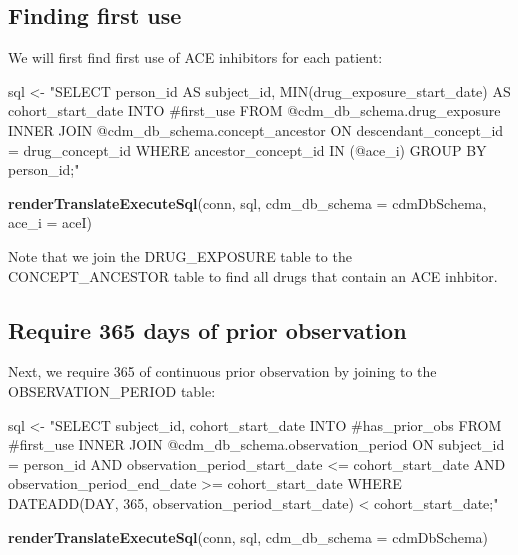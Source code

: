 \documentclass[11pt]{book}
\newenvironment{Shaded}{\begin{snugshade}}{\end{snugshade}}
\newcommand{\DataTypeTok}[1]{\textcolor[rgb]{0.13,0.29,0.53}{#1}}
\newcommand{\KeywordTok}[1]{\textcolor[rgb]{0.13,0.29,0.53}{\textbf{#1}}}
\newcommand{\NormalTok}[1]{#1}
\newcommand{\StringTok}[1]{\textcolor[rgb]{0.31,0.60,0.02}{#1}}
\theoremstyle{definition}
\theoremstyle{definition}
\theoremstyle{definition}
\theoremstyle{remark}
\begin{document}
\hypertarget{finding-first-use}{%
\subsection{Finding first use}\label{finding-first-use}}

We will first find first use of ACE inhibitors for each patient:

\begin{Shaded}
\begin{Highlighting}[]
\NormalTok{sql <-}\StringTok{ "SELECT person_id AS subject_id,}
\StringTok{  MIN(drug_exposure_start_date) AS cohort_start_date}
\StringTok{INTO #first_use}
\StringTok{FROM @cdm_db_schema.drug_exposure}
\StringTok{INNER JOIN @cdm_db_schema.concept_ancestor}
\StringTok{  ON descendant_concept_id = drug_concept_id}
\StringTok{WHERE ancestor_concept_id IN (@ace_i)}
\StringTok{GROUP BY person_id;"}

\KeywordTok{renderTranslateExecuteSql}\NormalTok{(conn, sql, }\DataTypeTok{cdm_db_schema =}\NormalTok{ cdmDbSchema, }\DataTypeTok{ace_i =}\NormalTok{ aceI)}
\end{Highlighting}
\end{Shaded}

Note that we join the DRUG\_EXPOSURE table to the CONCEPT\_ANCESTOR table to find all drugs that contain an ACE inhbitor.

\hypertarget{require-365-days-of-prior-observation}{%
\subsection{Require 365 days of prior observation}\label{require-365-days-of-prior-observation}}

Next, we require 365 of continuous prior observation by joining to the OBSERVATION\_PERIOD table:

\begin{Shaded}
\begin{Highlighting}[]
\NormalTok{sql <-}\StringTok{ "SELECT subject_id,}
\StringTok{  cohort_start_date}
\StringTok{INTO #has_prior_obs}
\StringTok{FROM #first_use}
\StringTok{INNER JOIN @cdm_db_schema.observation_period}
\StringTok{  ON subject_id = person_id}
\StringTok{    AND observation_period_start_date <= cohort_start_date}
\StringTok{    AND observation_period_end_date >= cohort_start_date}
\StringTok{WHERE DATEADD(DAY, 365, observation_period_start_date) < cohort_start_date;"}

\KeywordTok{renderTranslateExecuteSql}\NormalTok{(conn, sql, }\DataTypeTok{cdm_db_schema =}\NormalTok{ cdmDbSchema)}
\end{Highlighting}
\end{Shaded}
\end{document}
